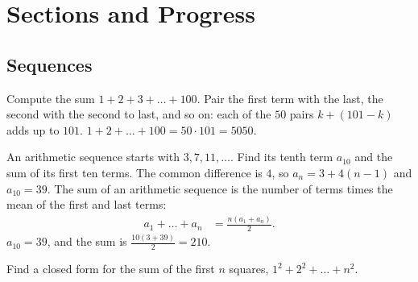 
\chapter{Sections and Progress}


\section{Sequences}


\begin{problem}
{
Compute the sum $1 + 2 + 3 + \dots + 100$.
}
{
Pair the first term with the last, the second with the second to last, and
so on: each of the $50$ pairs $k + (101 - k)$ adds up to $101$.
}
{
$1 + 2 + \dots + 100 = 50 \cdot 101 = 5050$.
}
\end{problem}


\begin{problem}
{
An arithmetic sequence starts with $3, 7, 11, \dots$. Find its tenth term
$a_{10}$ and the sum of its first ten terms.\label{prob:arithmetic}
}
{
The common difference is $4$, so $a_n = 3 + 4(n - 1)$ and $a_{10} = 39$. The
sum of an arithmetic sequence is the number of terms times the mean of the
first and last terms:
\begin{align}
    a_1 + \dots + a_n &= \frac{n (a_1 + a_n)}{2}. \label{eq:arithmetic-sum}
\end{align}
}
{
$a_{10} = 39$, and the sum is $\frac{10 (3 + 39)}{2} = 210$.
}
\end{problem}


\begin{problem}
{
Find a closed form for the sum of the first $n$ squares,
$1^2 + 2^2 + \dots + n^2$.
}{}{}
\end{problem}

